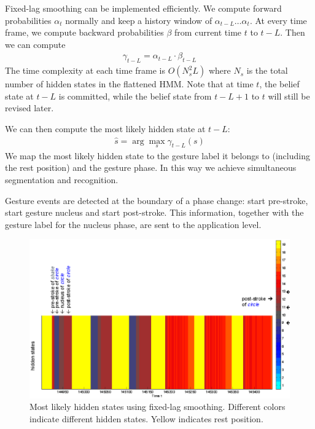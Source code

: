 \documentclass[conference]{IEEEtran}
\begin{document}
Fixed-lag smoothing can be implemented efficiently. We compute forward
probabilities $\alpha_t$ normally and keep a history window of $\alpha_{t -
L}\ldots\alpha_t$. At every time frame, we compute backward probabilities
$\beta$ from current time $t$ to $t - L$. Then we can compute
\begin{align}
\gamma_{t - L} = \alpha_{t - L} \cdot \beta_{t - L}
\end{align}  
The time complexity at each time frame is $O(N_s^2L)$ where $N_s$ is the total
number of hidden states in the flattened HMM. Note that at time $t$, the belief
state at $t - L$ is committed, while the belief state from $t - L + 1$ to $t$ will still be revised later.

We can then compute the most likely hidden state at $t - L$:
\begin{align}
\hat{s} = \arg\max_s \gamma_{t - L}(s)
\end{align}
We map the most likely hidden state to the gesture label it
belongs to (including the rest position) and the gesture phase. In this way
we achieve simultaneous segmentation and recognition.

Gesture events are detected at the boundary of a phase change: start pre-stroke,
start gesture nucleus and start post-stroke. This information, together with the
gesture label for the nucleus phase, are sent to the application level.

\begin{figure}[t]
\centering
\includegraphics[trim=0 5mm 0
5mm, clip, width=1.1\columnwidth]{fig/circle_shake_label.ps}
\caption{Most likely hidden states using fixed-lag smoothing. Different colors indicate different hidden states. Yellow indicates rest position.}
\label{fig:visual_hidden}
\end{figure}
\end{document}
